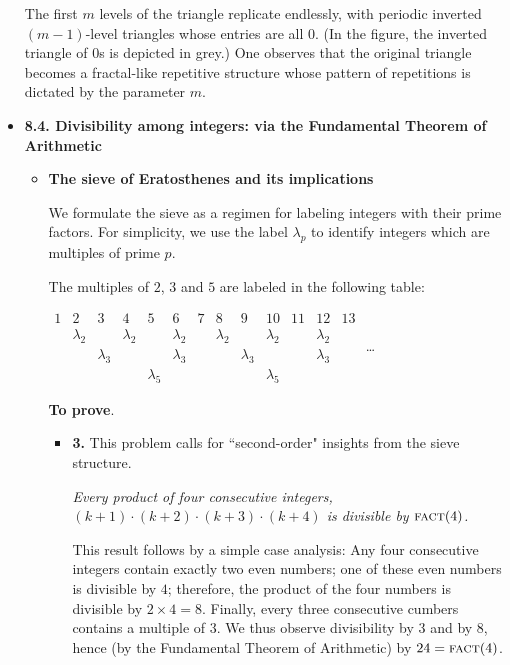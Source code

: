 \begin{itemize}
The first $m$ levels of the triangle replicate endlessly, with periodic inverted $(m-1)$-level triangles whose entries are all $0$.  (In the figure, the inverted triangle of $0$s is depicted in grey.)   One observes that the original triangle becomes a fractal-like repetitive structure whose pattern of repetitions is dictated by the parameter $m$.

%
\medskip\item
{\bf 8.4. Divisibility among integers: via the Fundamental Theorem of Arithmetic}

  \begin{itemize}
\item
{\bf The sieve of Eratosthenes and its implications}

We formulate the sieve as a regimen for labeling integers with their prime factors.  For simplicity, we use the label $\lambda_p$ to identify integers which are multiples of prime $p$.

\medskip

The multiples of $2$, $3$ and $5$ are labeled in the following table:

\medskip

\hspace*{.25in}
$\begin{array}{c|c|c|c|c|c|c|c|c|c|c|c|c}
1 & 2 & 3 & 4 & 5 & 6 & 7 & 8 & 9 & 10 & 11 & 12 & 13 \\
 & \lambda_2 & & \lambda_2 & & \lambda_2 & & \lambda_2 & & \lambda_2 & & \lambda_2 & \\
 & & \lambda_3 & &  & \lambda_3 & & & \lambda_3 & & & \lambda_3 & \\
 & & & & \lambda_5 & & & & & \lambda_5 & & & 
\end{array}$ \ldots

\bigskip

{\bf To prove}.
     \begin{itemize}
     \item 
     {\bf 3.}
This problem calls for ``second-order" insights from the sieve structure.

\smallskip

{\em Every product of four consecutive integers, $(k+1) \cdot (k+2) \cdot (k+3) \cdot (k+4)$ is divisible by $\mbox{\sc fact}(4)$.}

\smallskip

This result follows by a simple case analysis:  Any four consecutive integers contain exactly two even numbers; one of these even numbers is divisible by $4$; therefore, the product of the four numbers is divisible by $2 \times 4 = 8$.  Finally, every three consecutive cumbers contains a multiple of $3$.  We thus observe divisibility by $3$ and by $8$, hence (by the Fundamental Theorem of Arithmetic) by $24 = \mbox{\sc fact}(4)$.


\end{itemize}
\end{itemize}
\end{itemize}
